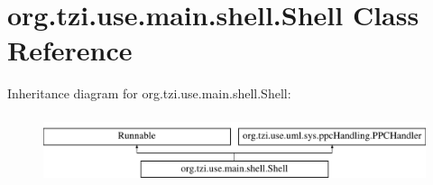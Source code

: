 \hypertarget{classorg_1_1tzi_1_1use_1_1main_1_1shell_1_1_shell}{\section{org.\-tzi.\-use.\-main.\-shell.\-Shell Class Reference}
\label{classorg_1_1tzi_1_1use_1_1main_1_1shell_1_1_shell}
}
Inheritance diagram for org.\-tzi.\-use.\-main.\-shell.\-Shell\-:\begin{figure}[H]
\begin{center}
\leavevmode
\includegraphics[height=2.000000cm]{classorg_1_1tzi_1_1use_1_1main_1_1shell_1_1_shell}
\end{center}
\end{figure}
